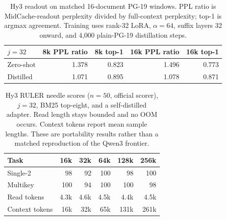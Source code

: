 \begin{table}[htbp]
\centering
\small
\setlength{\tabcolsep}{4pt}
\begin{tabular}{@{}lrrrr@{}}
\toprule
$j=32$ & 8k PPL ratio & 8k top-1 & 16k PPL ratio & 16k top-1 \\
\midrule
Zero-shot & 1.378 & 0.823 & 1.496 & 0.773 \\
Distilled & 1.071 & 0.895 & 1.078 & 0.871 \\
\bottomrule
\end{tabular}
\caption{Hy3 readout on matched 16-document PG-19 windows. PPL ratio is MidCache-readout perplexity divided by full-context perplexity; top-1 is argmax agreement. Training uses rank-32 LoRA, $\alpha=64$, suffix layers 32 onward, and 4,000 plain-PG-19 distillation steps.}
\label{tab:hy3}
\end{table}

\begin{table}[htbp]
\centering
\small
\setlength{\tabcolsep}{4pt}
\begin{tabular}{@{}lrrrrr@{}}
\toprule
Task & 16k & 32k & 64k & 128k & 256k \\
\midrule
Single-2 & 98 & 92 & 100 & 98 & 100 \\
Multikey & 100 & 94 & 100 & 100 & 98 \\
Read tokens & 4.3k & 4.6k & 4.5k & 4.4k & 4.5k \\
Context tokens & 16k & 32k & 65k & 131k & 261k \\
\bottomrule
\end{tabular}
\caption{Hy3 RULER needle scores ($n=50$, official scorer), $j=32$, BM25 top-eight, and a self-distilled adapter. Read length stays bounded and no OOM occurs. Context tokens report mean sample lengths. These are portability results rather than a matched reproduction of the Qwen3 frontier.}
\label{tab:hy3-ruler}
\end{table}
